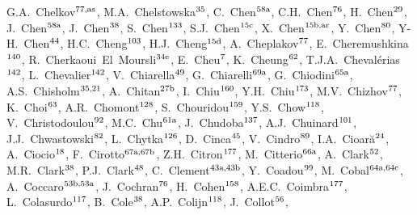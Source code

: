 \begin{flushleft}
G.A.~Chelkov$^\textrm{\scriptsize 77,as}$,    
M.A.~Chelstowska$^\textrm{\scriptsize 35}$,    
C.~Chen$^\textrm{\scriptsize 58a}$,    
C.H.~Chen$^\textrm{\scriptsize 76}$,    
H.~Chen$^\textrm{\scriptsize 29}$,    
J.~Chen$^\textrm{\scriptsize 58a}$,    
J.~Chen$^\textrm{\scriptsize 38}$,    
S.~Chen$^\textrm{\scriptsize 133}$,    
S.J.~Chen$^\textrm{\scriptsize 15c}$,    
X.~Chen$^\textrm{\scriptsize 15b,ar}$,    
Y.~Chen$^\textrm{\scriptsize 80}$,    
Y-H.~Chen$^\textrm{\scriptsize 44}$,    
H.C.~Cheng$^\textrm{\scriptsize 103}$,    
H.J.~Cheng$^\textrm{\scriptsize 15d}$,    
A.~Cheplakov$^\textrm{\scriptsize 77}$,    
E.~Cheremushkina$^\textrm{\scriptsize 140}$,    
R.~Cherkaoui~El~Moursli$^\textrm{\scriptsize 34e}$,    
E.~Cheu$^\textrm{\scriptsize 7}$,    
K.~Cheung$^\textrm{\scriptsize 62}$,    
T.J.A.~Cheval\'erias$^\textrm{\scriptsize 142}$,    
L.~Chevalier$^\textrm{\scriptsize 142}$,    
V.~Chiarella$^\textrm{\scriptsize 49}$,    
G.~Chiarelli$^\textrm{\scriptsize 69a}$,    
G.~Chiodini$^\textrm{\scriptsize 65a}$,    
A.S.~Chisholm$^\textrm{\scriptsize 35,21}$,    
A.~Chitan$^\textrm{\scriptsize 27b}$,    
I.~Chiu$^\textrm{\scriptsize 160}$,    
Y.H.~Chiu$^\textrm{\scriptsize 173}$,    
M.V.~Chizhov$^\textrm{\scriptsize 77}$,    
K.~Choi$^\textrm{\scriptsize 63}$,    
A.R.~Chomont$^\textrm{\scriptsize 128}$,    
S.~Chouridou$^\textrm{\scriptsize 159}$,    
Y.S.~Chow$^\textrm{\scriptsize 118}$,    
V.~Christodoulou$^\textrm{\scriptsize 92}$,    
M.C.~Chu$^\textrm{\scriptsize 61a}$,    
J.~Chudoba$^\textrm{\scriptsize 137}$,    
A.J.~Chuinard$^\textrm{\scriptsize 101}$,    
J.J.~Chwastowski$^\textrm{\scriptsize 82}$,    
L.~Chytka$^\textrm{\scriptsize 126}$,    
D.~Cinca$^\textrm{\scriptsize 45}$,    
V.~Cindro$^\textrm{\scriptsize 89}$,    
I.A.~Cioar\u{a}$^\textrm{\scriptsize 24}$,    
A.~Ciocio$^\textrm{\scriptsize 18}$,    
F.~Cirotto$^\textrm{\scriptsize 67a,67b}$,    
Z.H.~Citron$^\textrm{\scriptsize 177}$,    
M.~Citterio$^\textrm{\scriptsize 66a}$,    
A.~Clark$^\textrm{\scriptsize 52}$,    
M.R.~Clark$^\textrm{\scriptsize 38}$,    
P.J.~Clark$^\textrm{\scriptsize 48}$,    
C.~Clement$^\textrm{\scriptsize 43a,43b}$,    
Y.~Coadou$^\textrm{\scriptsize 99}$,    
M.~Cobal$^\textrm{\scriptsize 64a,64c}$,    
A.~Coccaro$^\textrm{\scriptsize 53b,53a}$,    
J.~Cochran$^\textrm{\scriptsize 76}$,    
H.~Cohen$^\textrm{\scriptsize 158}$,    
A.E.C.~Coimbra$^\textrm{\scriptsize 177}$,    
L.~Colasurdo$^\textrm{\scriptsize 117}$,    
B.~Cole$^\textrm{\scriptsize 38}$,    
A.P.~Colijn$^\textrm{\scriptsize 118}$,    
J.~Collot$^\textrm{\scriptsize 56}$,    

\end{flushleft}
